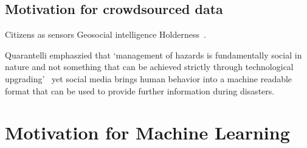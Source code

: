 \subsection{Motivation for crowdsourced data} Citizens as sensors Geosocial
intelligence
Holderness~\cite{holdernessSocialMediaGeoSocial2015a}.

Quarantelli emphaszied that  `management of hazards is fundamentally social in
nature and not something that can be achieved strictly through technological
upgrading'~\cite{tierneyFacingUnexpectedDisaster2001} yet social media brings
human behavior into a machine readable format that can be used to provide
further information during disasters.

\section{Motivation for Machine Learning}

